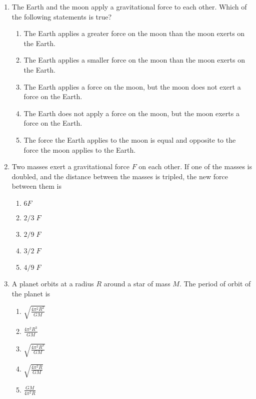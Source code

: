 \documentclass[12pt]{article}
\begin{document}
\begin{enumerate}[leftmargin=50pt,label=\underline{\hspace{0.4in}} \arabic*.]
\item The Earth and the moon apply a gravitational force to each other.
  Which of the following statements is true?
  \begin{enumerate}[noitemsep,topsep=0pt,leftmargin=18pt]  
  \item The Earth applies a greater force on the moon than the moon exerts on
    the Earth.
  \item The Earth applies a smaller force on the moon than the moon exerts on
    the Earth.
  \item The Earth applies a force on the moon, but the moon does not exert a
    force on the Earth.
  \item The Earth does not apply a force on the moon, but the moon exerts a
    force on the Earth.
  \item The force the Earth applies to the moon is equal and opposite to the
    force the moon applies to the Earth.
  \end{enumerate}
  \newpage
  
\item Two masses exert a gravitational force $F$ on each other. If one of the
  masses is doubled, and the distance between the masses is tripled, the
  new force between them is
  \begin{enumerate}[noitemsep,topsep=0pt,leftmargin=18pt]  
  \item $6F$
  \item $2/3\;F$
  \item $2/9\;F$
  \item $3/2\;F$
  \item $4/9\;F$
  \end{enumerate}

\item A planet orbits at a radius $R$ around a star of mass $M$. The period of
  orbit of the planet is
  \begin{enumerate}[noitemsep,topsep=0pt,leftmargin=18pt]  
  \item $\displaystyle\sqrt{\frac{4\pi^2R^2}{GM}}$
  \item $\displaystyle\frac{4\pi^2R^3}{GM}$
  \item $\displaystyle\sqrt{\frac{4\pi^2R^3}{GM}}$
  \item $\displaystyle\sqrt{\frac{4\pi^2R}{GM}}$
  \item $\displaystyle\frac{GM}{4\pi^2R}$
  \end{enumerate}
  

\end{enumerate}
\end{document}
